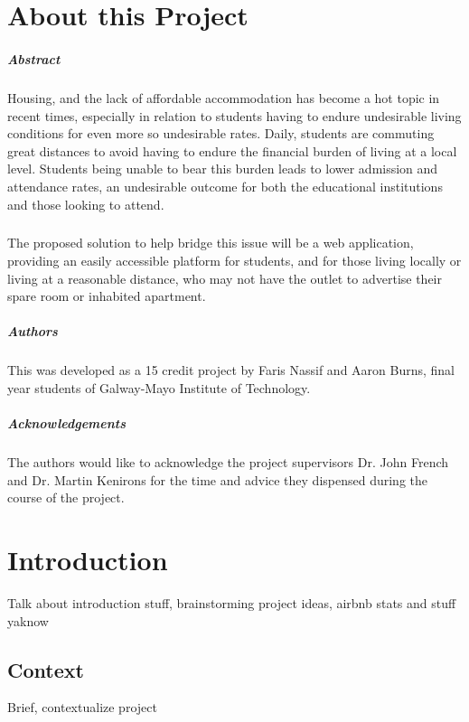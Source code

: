 \chapter*{About this Project}
\paragraph{Abstract}
Housing, and the lack of affordable accommodation has become a hot topic in recent times, especially in relation to students having to endure undesirable living conditions for even more so undesirable rates. Daily, students are commuting great distances to avoid having to endure the financial burden of living at a local level. Students being unable to bear this burden leads to lower admission and attendance rates, an undesirable outcome for both the educational institutions and those looking to attend. 

\paragraph{}
The proposed solution to help bridge this issue will be a web application, providing an easily accessible platform for students, and for those living locally or living at a reasonable distance, who may not have the outlet to advertise their spare room or inhabited apartment. 

\paragraph{Authors}
This was developed as a 15 credit project by Faris Nassif and Aaron Burns, final year students of Galway-Mayo Institute of Technology.

\paragraph{Acknowledgements}
The authors would like to acknowledge the project supervisors Dr. John French and Dr. Martin Kenirons for the time and advice they dispensed during the course of the project.

\chapter{Introduction}
Talk about introduction stuff, brainstorming project ideas, airbnb stats and stuff yaknow 

\section{Context}
Brief, contextualize project
